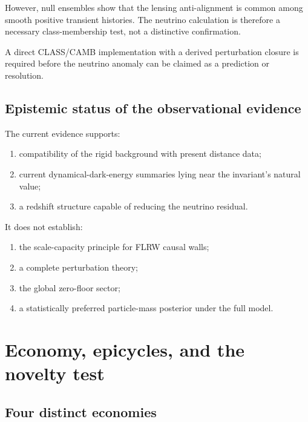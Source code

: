 \documentclass[
  11pt,
  letterpaper,
]{article}
\providecommand{\tightlist}{%
  \setlength{\itemsep}{0pt}\setlength{\parskip}{0pt}}
\begin{document}
However, null ensembles show that the lensing anti-alignment is common
among smooth positive transient histories. The neutrino calculation is
therefore a necessary class-membership test, not a distinctive
confirmation.

A direct CLASS/CAMB implementation with a derived perturbation closure
is required before the neutrino anomaly can be claimed as a prediction
or resolution.

\subsection{Epistemic status of the observational
evidence}\label{epistemic-status-of-the-observational-evidence}

The current evidence supports:

\begin{enumerate}
\def\labelenumi{\arabic{enumi}.}
\tightlist
\item
  compatibility of the rigid background with present distance data;
\item
  current dynamical-dark-energy summaries lying near the invariant's
  natural value;
\item
  a redshift structure capable of reducing the neutrino residual.
\end{enumerate}

It does not establish:

\begin{enumerate}
\def\labelenumi{\arabic{enumi}.}
\tightlist
\item
  the scale-capacity principle for FLRW causal walls;
\item
  a complete perturbation theory;
\item
  the global zero-floor sector;
\item
  a statistically preferred particle-mass posterior under the full
  model.
\end{enumerate}

\section{Economy, epicycles, and the novelty
test}\label{economy-epicycles-and-the-novelty-test}

\subsection{Four distinct economies}\label{four-distinct-economies}
\end{document}
